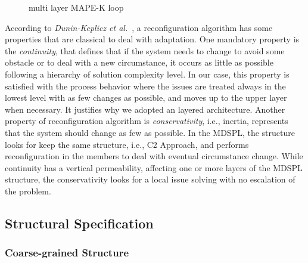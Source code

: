 \begin{figure}[h]
\centering
\label{mape01}
\scalebox{1}{}
\caption{multi layer MAPE-K loop}
\end{figure}


According to \textit{Dunin-Keplicz et al.}~\cite{Dunin-Keplicz2010}, a reconfiguration algorithm has some properties that are classical to deal with adaptation. One mandatory property is the \textit{continuity}, that defines that if the system needs to change to avoid some obstacle or to deal with a new circumstance, it occurs as little as possible following a hierarchy of solution complexity level. In our case, this property is satisfied with the process behavior where the issues are treated always in the lowest level with as few changes as possible, and moves up to the upper layer when necessary. It justifies why we adopted an layered architecture. Another property of reconfiguration algorithm is \textit{conservativity}, i.e., inertia, represents that the system should change as few as possible. In the MDSPL, the structure looks for keep the same structure, i.e., C2 Approach, and performs reconfiguration in the members to deal with eventual circumstance change. While continuity has a vertical permeability, affecting one or more layers of the MDSPL structure, the conservativity looks for a local issue solving with no escalation of the problem.

%
%

\subsection{Structural Specification}

\subsubsection{Coarse-grained Structure }

